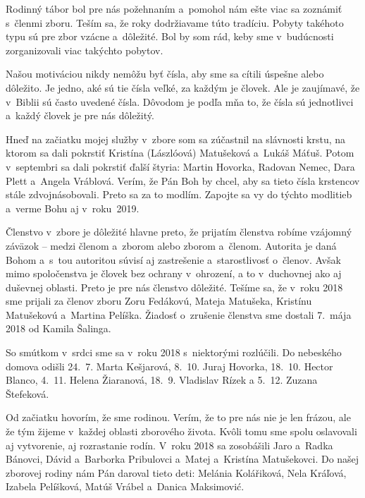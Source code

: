 Rodinný tábor bol pre nás požehnaním a~pomohol nám ešte viac sa zoznámiť s~členmi zboru. Teším sa, že roky dodržiavame túto tradíciu. Pobyty takéhoto typu sú pre zbor vzácne a~dôležité. Bol by som rád, keby sme v~budúcnosti zorganizovali viac takýchto pobytov.


Našou motiváciou nikdy nemôžu byť čísla, aby sme sa cítili úspešne alebo dôležito. Je jedno, aké sú tie čísla veľké, za každým je človek. Ale je zaujímavé, že v~Biblii sú často uvedené čísla. Dôvodom je podľa mňa to, že čísla sú jednotlivci a~každý človek je pre nás dôležitý.

Hneď na začiatku mojej služby v~zbore som sa zúčastnil na slávnosti krstu, na ktorom sa dali pokrstiť Kristína (Lászlóová) Matušeková a~Lukáš Máťuš. Potom v~septembri sa dali pokrstiť ďalší štyria: Martin Hovorka, Radovan Nemec, Dara Plett a~Angela Vráblová. Verím, že Pán Boh by chcel, aby sa tieto čísla krstencov stále zdvojnásobovali. Preto sa za to modlím. Zapojte sa vy do týchto modlitieb a~verme Bohu aj v~roku~2019.

Členstvo v~zbore je dôležité hlavne preto, že prijatím členstva robíme vzájomný záväzok -- medzi členom a~zborom alebo zborom a~členom. Autorita je daná Bohom a~s~tou autoritou súvisí aj zastrešenie a~starostlivosť o~členov. Avšak mimo spoločenstva je človek bez ochrany v~ohrození, a to v~duchovnej ako aj duševnej oblasti. Preto je pre nás členstvo dôležité. Tešíme sa, že v~roku 2018 sme prijali za členov zboru Zoru Fedákovú, Mateja Matušeka, Kristínu Matušekovú a~Martina Pelíška. Žiadosť o~zrušenie členstva sme dostali 7.~mája 2018 od Kamila Šalinga.

So smútkom v~srdci sme sa v~roku 2018 s~niektorými rozlúčili. Do nebeského domova odišli 24.~7. Marta Kešjarová, 8.~10. Juraj Hovorka, 18.~10. Hector Blanco, 4.~11. Helena Žiaranová, 18.~9. Vladislav Rízek a 5.~12. Zuzana Štefeková.


Od začiatku hovorím, že sme rodinou. Verím, že to pre nás nie je len frázou, ale že tým žijeme v~každej oblasti zborového života. Kvôli tomu sme spolu oslavovali aj vytvorenie, aj rozrastanie rodín. V~roku 2018 sa zosobášili Jaro a~Radka Bánovci, Dávid a~Barborka Pribulovci a~Matej a~Kristína Matušekovci.  Do našej zborovej rodiny nám Pán daroval tieto deti: Melánia Kolářiková, Nela Kráľová, Izabela Pelíšková, Matúš Vrábel a~Danica Maksimović.


